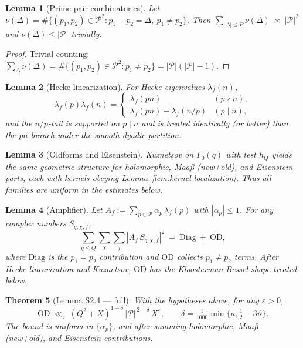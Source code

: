 \documentclass[11pt]{article}
\newtheorem{lemma}{Lemma}[section]
\newtheorem{theorem}[lemma]{Theorem}
\theoremstyle{definition}
\theoremstyle{remark}
\begin{document}
\begin{lemma}[Prime pair combinatorics]\label{lem:prime-pair}
	Let $\nu(\Delta)=\#\{(p_1,p_2)\in\mathcal P^2: p_1-p_2=\Delta,\ p_1\ne p_2\}$. Then
	\(
	\sum_{|\Delta|\le P}\nu(\Delta)\ \asymp\ |\mathcal P|^2
	\)
	and $\nu(\Delta)\le |\mathcal P|$ trivially.
\end{lemma}

\begin{proof}
	Trivial counting: $\sum_{\Delta}\nu(\Delta)=\#\{(p_1,p_2)\in\mathcal P^2: p_1\ne p_2\}=|\mathcal P|(|\mathcal P|-1)$.
\end{proof}

\begin{lemma}[Hecke linearization]\label{lem:hecke-linearization}
	For Hecke eigenvalues $\lambda_f(n)$,
	\[
		\lambda_f(p)\lambda_f(n)=
		\begin{cases}
			\lambda_f(pn)                & (p\nmid n), \\
			\lambda_f(pn)-\lambda_f(n/p) & (p\mid n),
		\end{cases}
	\]
	and the $n/p$-tail is supported on $p\mid n$ and is treated identically (or better) than the $pn$-branch under the smooth dyadic partition.
\end{lemma}

\begin{lemma}[Oldforms and Eisenstein]\label{lem:old-eis}
	Kuznetsov on $\Gamma_0(q)$ with test $h_Q$ yields the same geometric structure for holomorphic, Maaß (new+old), and Eisenstein parts, each with kernels obeying Lemma~\ref{lem:kernel-localization}. Thus all families are uniform in the estimates below.
\end{lemma}

\begin{lemma}[Amplifier]\label{lem:amplifier}
	Let $A_f:=\sum_{p\in\mathcal P}\alpha_p\,\lambda_f(p)$ with $|\alpha_p|\le 1$. For any complex numbers $S_{q,\chi,f}$,
	\[
		\sum_{q\le Q}\sum_{\chi}\sum_f |A_f\,S_{q,\chi,f}|^2
		\ =\ \mathrm{Diag}\ +\ \mathrm{OD},
	\]
	where $\mathrm{Diag}$ is the $p_1=p_2$ contribution and $\mathrm{OD}$ collects $p_1\ne p_2$ terms. After Hecke linearization and Kuznetsov, $\mathrm{OD}$ has the Kloosterman-Bessel shape treated below.
\end{lemma}

\begin{theorem}[Lemma S2.4 — full]\label{lem:S2.4}
	With the hypotheses above, for any $\varepsilon>0$,
	\[
		\mathrm{OD}\ \ll_{\varepsilon}\ (Q^2+X)^{1-\delta}\,|\mathcal P|^{\,2-\delta}\,X^{\varepsilon},
		\qquad
		\delta=\tfrac1{1000}\min\{\kappa,\tfrac12-3\vartheta\}.
	\]
	The bound is uniform in $\{\alpha_p\}$, and after summing holomorphic, Maaß (new+old), and Eisenstein contributions.
\end{theorem}
\end{document}
